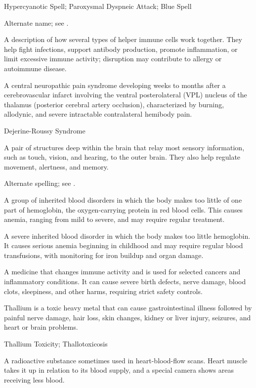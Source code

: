 \synonyms
Hypercyanotic Spell; Paroxysmal Dyspneic Attack; Blue Spell

 Alternate name; see .

 A description of how several types of helper immune cells work together. They help fight infections, support antibody production, promote inflammation, or limit excessive immune activity; disruption may contribute to allergy or autoimmune disease.

 A central neuropathic pain syndrome developing weeks to months after a cerebrovascular infarct involving the ventral posterolateral (VPL) nucleus of the thalamus (posterior cerebral artery occlusion), characterized by burning, allodynic, and severe intractable contralateral hemibody pain.

\synonyms
Dejerine-Roussy Syndrome

 A pair of structures deep within the brain that relay most sensory information, such as touch, vision, and hearing, to the outer brain. They also help regulate movement, alertness, and memory.

 Alternate spelling; see .

 A group of inherited blood disorders in which the body makes too little of one part of hemoglobin, the oxygen-carrying protein in red blood cells. This causes anemia, ranging from mild to severe, and may require regular treatment.

 A severe inherited blood disorder in which the body makes too little hemoglobin. It causes serious anemia beginning in childhood and may require regular blood transfusions, with monitoring for iron buildup and organ damage.

 A medicine that changes immune activity and is used for selected cancers and inflammatory conditions. It can cause severe birth defects, nerve damage, blood clots, sleepiness, and other harms, requiring strict safety controls.

 Thallium is a toxic heavy metal that can cause gastrointestinal illness followed by painful nerve damage, hair loss, skin changes, kidney or liver injury, seizures, and heart or brain problems.

\synonyms
Thallium Toxicity; Thallotoxicosis

 A radioactive substance sometimes used in heart-blood-flow scans. Heart muscle takes it up in relation to its blood supply, and a special camera shows areas receiving less blood.

